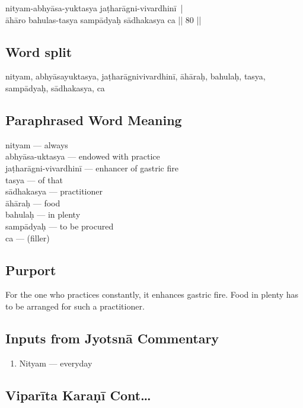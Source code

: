 \begin{shloka}
nityam-abhyāsa-yuktasya jaṭharāgni-vivardhinī |\\
āhāro bahulas-tasya sampādyaḥ sādhakasya ca || 80 ||
\end{shloka}

\subsection*{Word split}

nityam, abhyāsayuktasya, jaṭharāgnivivardhinī, āhāraḥ, bahulaḥ, tasya, sampādyaḥ, sādhakasya, ca

\subsection*{Paraphrased Word Meaning}

\begin{multicols}{2}
nityam --- always \\
abhyāsa-uktasya ---  endowed with practice \\
jaṭharāgni-vivardhinī ---  enhancer of gastric fire \\
tasya --- of that  \\
sādhakasya ---  practitioner \\
āhāraḥ --- food \\
bahulaḥ --- in plenty \\
sampādyaḥ ---  to be procured \\
ca --- (filler)
\end{multicols}

\subsection*{Purport}

For the one who practices constantly, it enhances gastric fire. Food in plenty has to be arranged for such a practitioner. 

\subsection*{Inputs from Jyotsnā Commentary}

\begin{enumerate}
\item Nityam --- everyday 
\end{enumerate}

\subsection*{Viparīta Karaṇī Cont…}

